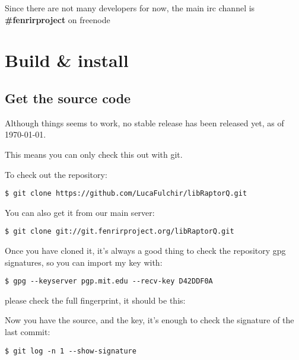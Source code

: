 \documentclass[11pt,a4paper]{refart}
\begin{document}
 Since there are not many developers for now, the main irc channel is \textbf{\#fenrirproject} on freenode


\section{Build \& install}
\subsection{Get the source code}
Although things seems to work, no stable release has been released yet, as of \today.

This means you can only check this out with git.

To check out the repository:

\begin{verbatim}
$ git clone https://github.com/LucaFulchir/libRaptorQ.git
\end{verbatim}

You can also get it from our main server:

\begin{verbatim}
$ git clone git://git.fenrirproject.org/libRaptorQ.git
\end{verbatim}

Once you have cloned it, it's always a good thing to check the repository gpg
signatures, so you can import my key with:

\begin{verbatim}
$ gpg --keyserver pgp.mit.edu --recv-key D42DDF0A
\end{verbatim}

please check the full fingerprint, it should be this:

\theverbbox


Now you have the source, and the key, it's enough to check the signature of the
last commit:

\begin{verbatim}
$ git log -n 1 --show-signature
\end{verbatim}
\end{document}
